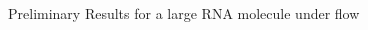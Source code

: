 \documentclass[final]{beamer}
\begin{document}
\begin{columns}[t]
\begin{column}{.33\linewidth}
\begin{block}{Preliminary Results for a large RNA molecule under flow}
        \end{block}
      \end{column}
    \end{columns}
  
\end{document}
